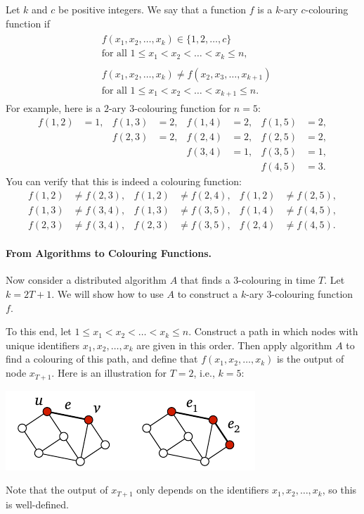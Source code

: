Let $k$ and $c$ be positive integers. We say that a function $f$ is a $k$-ary $c$-colouring function if
\begin{align}
    \begin{split}
    &f(x_1, x_2, \dotsc, x_k) \in \{1,2,\dotsc,c\} \\
    &\text{for all } 1 \le x_1 < x_2 < \dotso < x_k \le n,
    \end{split}
    \label{eq:col1} \\[3pt]
    \begin{split}
    &f(x_1, x_2, \dotsc, x_k) \ne f(x_2, x_3, \dotsc, x_{k+1}) \\
    &\text{for all } 1 \le x_1 < x_2 < \dotso < x_{k+1} \le n.
    \end{split}
    \label{eq:col2}
\end{align}
For example, here is a $2$-ary $3$-colouring function for $n = 5$:
\begin{align*}
    f(1,2) &= 1, &
    f(1,3) &= 2, &
    f(1,4) &= 2, &
    f(1,5) &= 2, \\&&
    f(2,3) &= 2, &
    f(2,4) &= 2, &
    f(2,5) &= 2, \\&&&&
    f(3,4) &= 1, &
    f(3,5) &= 1, \\&&&&&&
    f(4,5) &= 3.
\end{align*}
You can verify that this is indeed a colouring function:
\begin{align*}
    f(1,2) &\ne f(2,3), &
    f(1,2) &\ne f(2,4), &
    f(1,2) &\ne f(2,5), \\
    f(1,3) &\ne f(3,4), &
    f(1,3) &\ne f(3,5), &
    f(1,4) &\ne f(4,5), \\
    f(2,3) &\ne f(3,4), &
    f(2,3) &\ne f(3,5), &
    f(2,4) &\ne f(4,5).
\end{align*}


\paragraph{From Algorithms to Colouring Functions.}

Now consider a distributed algorithm $A$ that finds a $3$-colouring in time $T$. Let $k = 2T+1$. We will show how to use $A$ to construct a $k$-ary $3$-colouring function $f$.

To this end, let $1 \le x_1 < x_2 < \dotso < x_k \le n$. Construct a path in which nodes with unique identifiers $x_1, x_2, \dotsc, x_k$ are given in this order. Then apply algorithm $A$ to find a colouring of this path, and define that $f(x_1, x_2, \dotsc, x_k)$ is the output of node $x_{T+1}$. Here is an illustration for $T = 2$, i.e., $k = 5$:
\begin{center}
    \includegraphics[page=\PIntroIdIncr]{figs.pdf}
\end{center}
Note that the output of $x_{T+1}$ only depends on the identifiers $x_1, x_2, \dotsc,\allowbreak x_k$, so this is well-defined.

